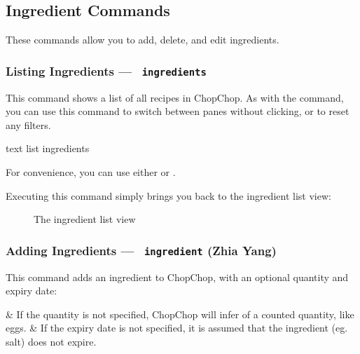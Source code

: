 
\pagebreak
\hypertarget{GroupIngredientCommands}{}
\subsection{Ingredient Commands}

These commands allow you to add, delete, and edit ingredients.

\hypertarget{ListIngredientCommand}{}
\subsubsection{Listing Ingredients — \texttt{ ingredients}}

	This command shows a list of all recipes in ChopChop. As with the  command, you can use this command to switch
	between panes without clicking, or to reset any filters.

	 \begin{blockofcode}{text}
		list ingredients
	\end{blockofcode}

	\begin{infobox}
		\bulb{} \hspace{.6em}\parbox{0.9\textwidth}{%
			 For convenience, you can use either  or .
		}
	\end{infobox}

	Executing this command simply brings you back to the ingredient list view:

	\begin{figure}[!htbp]\centering
		\caption{The ingredient list view}
	\end{figure}



\pagebreak
\hypertarget{AddIngredientCommand}{}
\subsubsection{Adding Ingredients — \texttt{ ingredient} (Zhia Yang)}

	This command adds an ingredient to ChopChop, with an optional quantity and expiry date:
	\begin{bulletlist}
		& If the quantity is not specified, ChopChop will infer  of a counted quantity, like eggs.
		& If the expiry date is not specified, it is assumed that the ingredient (eg. salt) does not expire.
	\end{bulletlist}

